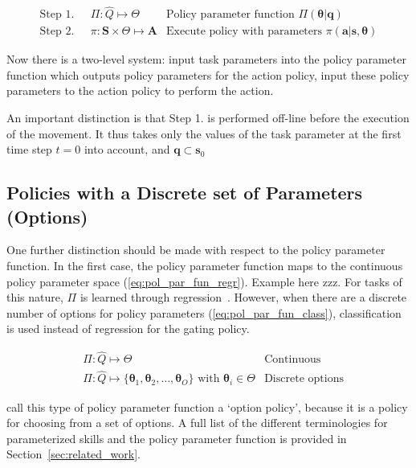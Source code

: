 \documentclass[12pt]{article}
\newcommand{\mymath}[1]{\ensuremath{#1}\xspace}
\newcommand{\pol}    {\mymath{\pi}}
\newcommand{\act}    {\mymath{\mathbf{a}}}
\newcommand{\actsp}  {\mymath{\mathbf{A}}}
\newcommand{\sta}    {\mymath{\mathbf{s}}}
\newcommand{\stasp}  {\mymath{\mathbf{S}}}
\newcommand{\app}    {\mymath{\bm{\theta}}}
\newcommand{\appsp}  {\mymath{\Theta}}
\newcommand{\polg}   {\mymath{\Pi}}
\newcommand{\taskp}  {\mymath{\mathbf{q}}}
\newcommand{\taskpsp}{\mymath{Q}}
\begin{document}
\begin{align}
\mbox{Step 1.~~}&\polg:\hat{\taskpsp}\mapsto\appsp & \mbox{Policy parameter function~} \polg(\app|\taskp)\label{eq:pol_par_fun}\\
\mbox{Step 2.~~}&\pol:\stasp\times\appsp\mapsto\actsp & \mbox{Execute policy with parameters~}  \pol(\act|\sta,\app)
\end{align}

Now there is a two-level system: input task parameters into the policy parameter function which outputs policy parameters for the action policy, input these policy parameters to the action policy to perform the action. 

An important distinction is that Step 1. is performed off-line before the execution of the movement. It thus takes only the values of the task parameter at the first time step $t=0$ into account, and $\taskp \subset \sta_0$


\subsection{Policies with a Discrete set of Parameters (Options)}

One further distinction should be made with respect to the policy parameter function. In the first case, the policy parameter function maps to the continuous policy parameter space (\ref{eq:pol_par_fun_regr}). Example here zzz. For tasks of this nature, \polg is learned through regression~\cite{ude10taskspecific,matsubara11learning,silva12learning,stulp13learning}.
However, when there are a discrete number of options for policy parameters (\ref{eq:pol_par_fun_class}), classification is used instead of regression for the gating policy.

\begin{align}
&\polg : \hat{\taskpsp} \mapsto \appsp & \mbox{Continuous} \label{eq:pol_par_fun_regr}\\
&\polg : \hat{\taskpsp} \mapsto \{\app_1,\app_2,\dots,\app_O\} \mbox{~with~} \app_i \in \appsp & \mbox{Discrete options} \label{eq:pol_par_fun_class}
\end{align}

\citet{daniel12learning} call this type of policy parameter function a `option policy', because it is a policy for choosing from a set of options. A full list of the different terminologies for parameterized skills and the policy parameter function is provided in Section~\ref{sec:related_work}. 
\end{document}
